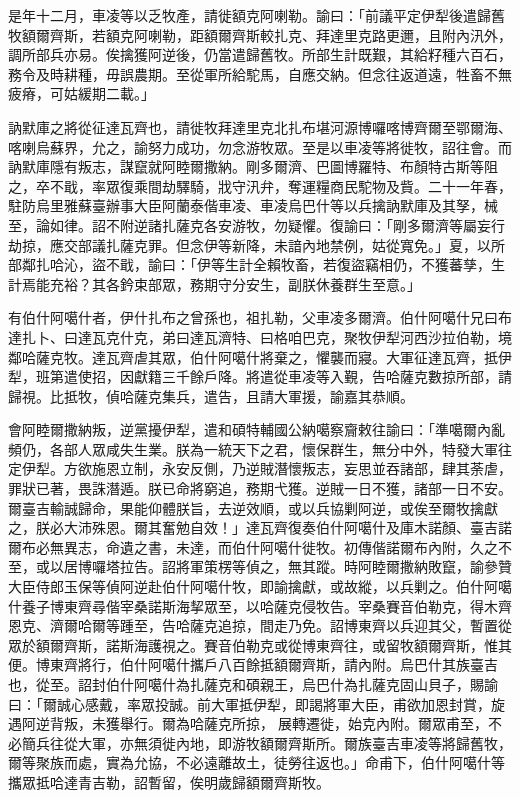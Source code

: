 \begin{pinyinscope}
是年十二月，車凌等以乏牧產，請徙額克阿喇勒。諭曰：「前議平定伊犁後遣歸舊牧額爾齊斯，若額克阿喇勒，距額爾齊斯較扎克、拜達里克路更邇，且附內汛外，調所部兵亦易。俟擒獲阿逆後，仍當遣歸舊牧。所部生計既艱，其給籽種六百石，務令及時耕種，毋誤農期。至從軍所給駝馬，自應交納。但念往返道遠，牲畜不無疲瘠，可姑緩期二載。」

訥默庫之將從征達瓦齊也，請徙牧拜達里克北扎布堪河源博囉喀博齊爾至鄂爾海、喀喇烏蘇界，允之，諭努力成功，勿念游牧眾。至是以車凌等將徙牧，詔往會。而訥默庫隱有叛志，謀竄就阿睦爾撒納。剛多爾濟、巴圖博羅特、布顏特古斯等阻之，卒不戢，率眾復乘間劫驛騎，戕守汛弁，奪運糧商民駝物及貲。二十一年春，駐防烏里雅蘇臺辦事大臣阿蘭泰偕車凌、車凌烏巴什等以兵擒訥默庫及其孥，械至，論如律。詔不附逆諸扎薩克各安游牧，勿疑懼。復諭曰：「剛多爾濟等屬妄行劫掠，應交部議扎薩克罪。但念伊等新降，未諳內地禁例，姑從寬免。」夏，以所部鄰扎哈沁，盜不戢，諭曰：「伊等生計全賴牧畜，若復盜竊相仍，不獲蕃孳，生計焉能充裕？其各鈐束部眾，務期守分安生，副朕休養群生至意。」

有伯什阿噶什者，伊什扎布之曾孫也，祖扎勒，父車凌多爾濟。伯什阿噶什兄曰布達扎卜、曰達瓦克什克，弟曰達瓦濟特、曰格咱巴克，聚牧伊犁河西沙拉伯勒，境鄰哈薩克牧。達瓦齊虐其眾，伯什阿噶什將棄之，懼襲而寢。大軍征達瓦齊，抵伊犁，班第遣使招，因獻籍三千餘戶降。將遣從車凌等入覲，告哈薩克數掠所部，請歸視。比抵牧，偵哈薩克集兵，遣告，且請大軍援，諭嘉其恭順。

會阿睦爾撒納叛，逆黨擾伊犁，遣和碩特輔國公納噶察齎敕往諭曰：「準噶爾內亂頻仍，各部人眾咸失生業。朕為一統天下之君，懷保群生，無分中外，特發大軍往定伊犁。方欲施恩立制，永安反側，乃逆賊潛懷叛志，妄思並吞諸部，肆其荼虐，罪狀已著，畏誅潛遁。朕已命將窮追，務期弋獲。逆賊一日不獲，諸部一日不安。爾臺吉輸誠歸命，果能仰體朕旨，去逆效順，或以兵協剿阿逆，或俟至爾牧擒獻之，朕必大沛殊恩。爾其奮勉自效！」達瓦齊復奏伯什阿噶什及庫木諾顏、臺吉諾爾布必無異志，命遺之書，未達，而伯什阿噶什徙牧。初傳偕諾爾布內附，久之不至，或以居博囉塔拉告。詔將軍策楞等偵之，無其蹤。時阿睦爾撒納敗竄，諭參贊大臣侍郎玉保等偵阿逆赴伯什阿噶什牧，即諭擒獻，或故縱，以兵剿之。伯什阿噶什養子博東齊尋偕宰桑諾斯海挈眾至，以哈薩克侵牧告。宰桑賽音伯勒克，得木齊恩克、濟爾哈爾等踵至，告哈薩克追掠，間走乃免。詔博東齊以兵迎其父，暫置從眾於額爾齊斯，諾斯海護視之。賽音伯勒克或從博東齊往，或留牧額爾齊斯，惟其便。博東齊將行，伯什阿噶什攜戶八百餘抵額爾齊斯，請內附。烏巴什其族臺吉也，從至。詔封伯什阿噶什為扎薩克和碩親王，烏巴什為扎薩克固山貝子，賜諭曰：「爾誠心感戴，率眾投誠。前大軍抵伊犁，即謁將軍大臣，甫欲加恩封賞，旋遇阿逆背叛，未獲舉行。爾為哈薩克所掠，展轉遷徙，始克內附。爾眾甫至，不必簡兵往從大軍，亦無須徙內地，即游牧額爾齊斯所。爾族臺吉車凌等將歸舊牧，爾等聚族而處，實為允協，不必遠離故土，徒勞往返也。」命甫下，伯什阿噶什等攜眾抵哈達青吉勒，詔暫留，俟明歲歸額爾齊斯牧。


\end{pinyinscope}
